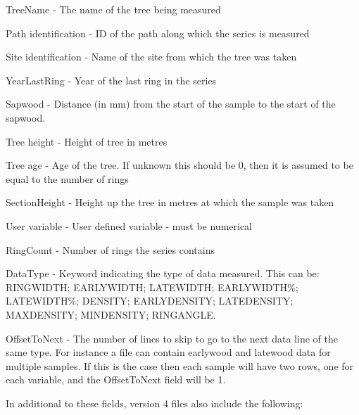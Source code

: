 \documentclass[10pt, headsepline,DIV14,BCOR0.5cm]{scrreprt}
\begin{document}
\begin{itemize*}
 \item TreeName - The name of the tree being measured
 \item Path identification - ID of the path along which the series is measured
 \item Site identification - Name of the site from which the tree was taken
 \item YearLastRing - Year of the last ring in the series
 \item Sapwood - Distance (in mm) from the start of the sample to the start of the sapwood.
 \item Tree height - Height of tree in metres
 \item Tree age - Age of the tree. If unknown this should be 0, then it is assumed to be equal to the number of rings
 \item SectionHeight - Height up the tree in metres at which the sample was taken
 \item User variable - User defined variable - must be numerical
 \item RingCount - Number of rings the series contains
 \item DataType - Keyword indicating the type of data measured. This can be: RINGWIDTH; EARLYWIDTH; LATEWIDTH; EARLYWIDTH\%; LATEWIDTH\%; DENSITY; EARLYDENSITY; LATEDENSITY; MAXDENSITY; MINDENSITY; RINGANGLE.
 \item OffsetToNext - The number of lines to skip to go to the next data line of the same type. For instance a file can contain earlywood and latewood data for multiple samples. If this is the case then each sample will have two rows, one for each variable, and the OffsetToNext field will be 1. 
\end{itemize*}

In additional to these fields, version 4 files also include the following: 
\end{document}
